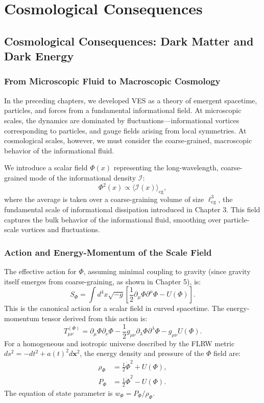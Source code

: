 \documentclass[12pt,a4paper]{book}
\newcommand{\I}{\mathcal{I}}
\begin{document}
\part{Cosmological Consequences}

\chapter{Cosmological Consequences: Dark Matter and Dark Energy}

\section{From Microscopic Fluid to Macroscopic Cosmology}

In the preceding chapters, we developed VES as a theory of emergent spacetime, particles, and forces from a fundamental informational field. At microscopic scales, the dynamics are dominated by fluctuations—informational vortices corresponding to particles, and gauge fields arising from local symmetries. At cosmological scales, however, we must consider the coarse-grained, macroscopic behavior of the informational fluid.

We introduce a scalar field $\Phi(x)$ representing the long-wavelength, coarse-grained mode of the informational density $\I$:
\begin{equation}
    \Phi^2(x) \propto \langle \I(x) \rangle_{\text{cg}},
\end{equation}
where the average is taken over a coarse-graining volume of size $\ell_{\text{cg}}^3$, the fundamental scale of informational dissipation introduced in Chapter 3. This field captures the bulk behavior of the informational fluid, smoothing over particle-scale vortices and fluctuations.

\section{Action and Energy-Momentum of the Scale Field}

The effective action for $\Phi$, assuming minimal coupling to gravity (since gravity itself emerges from coarse-graining, as shown in Chapter 5), is:
\begin{equation}
    S_\Phi = \int d^4x \sqrt{-g} \left[ \frac12 \partial_\mu \Phi \partial^\mu \Phi - U(\Phi) \right].
\end{equation}
This is the canonical action for a scalar field in curved spacetime. The energy-momentum tensor derived from this action is:
\begin{equation}
    T_{\mu\nu}^{(\Phi)} = \partial_\mu \Phi \partial_\nu \Phi - \frac12 g_{\mu\nu} \partial_\lambda \Phi \partial^\lambda \Phi - g_{\mu\nu} U(\Phi).
\end{equation}
For a homogeneous and isotropic universe described by the FLRW metric $ds^2 = -dt^2 + a(t)^2 d\mathbf{x}^2$, the energy density and pressure of the $\Phi$ field are:
\begin{align}
    \rho_\Phi &= \frac12 \dot{\Phi}^2 + U(\Phi), \\
    P_\Phi &= \frac12 \dot{\Phi}^2 - U(\Phi).
\end{align}
The equation of state parameter is $w_\Phi = P_\Phi / \rho_\Phi$.
\end{document}

